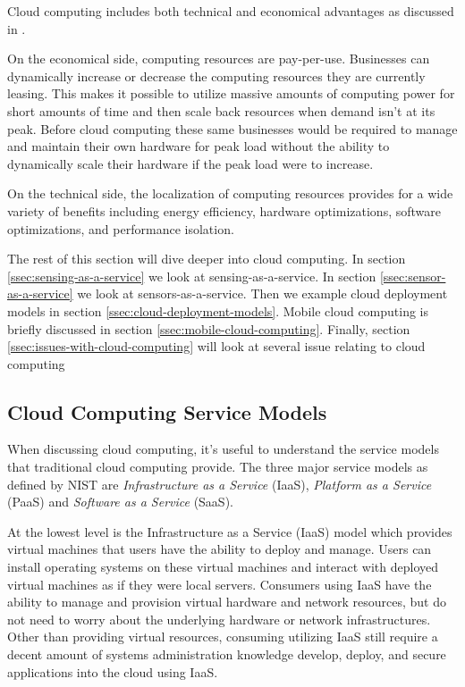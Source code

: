 \documentclass[]{article}
\begin{document}
Cloud computing includes both technical and economical advantages as discussed in \cite{botta_integration_2016}. 

On the economical side, computing resources are pay-per-use. Businesses can dynamically increase or decrease the computing resources they are currently leasing. This makes it possible to utilize massive amounts of computing power for short amounts of time and then scale back resources when demand isn't at its peak. Before cloud computing these same businesses would be required to manage and maintain their own hardware for peak load without the ability to dynamically scale their hardware if the peak load were to increase.

On the technical side, the localization of computing resources provides for a wide variety of benefits including energy efficiency, hardware optimizations, software optimizations, and performance isolation. 

The rest of this section will dive deeper into cloud computing. In section \ref{ssec:sensing-as-a-service} we look at sensing-as-a-service. In section \ref{ssec:sensor-as-a-service} we look at sensors-as-a-service. Then we example cloud deployment models in section \ref{ssec:cloud-deployment-models}. Mobile cloud computing is briefly discussed in section \ref{ssec:mobile-cloud-computing}. Finally, section \ref{ssec:issues-with-cloud-computing} will look at several issue relating to cloud computing

\subsection{Cloud Computing Service Models} \label{ssec:cloud-computing-service-models}
When discussing cloud computing, it's useful to understand the service models that traditional cloud computing provide. The three major service models as defined by NIST\cite{mell2011nist} are \textit{Infrastructure as a Service} (IaaS), \textit{Platform as a Service} (PaaS) and \textit{Software as a Service} (SaaS).

At the lowest level is  the Infrastructure as a Service (IaaS) model which provides virtual machines that users have the ability to  deploy and manage. Users can install operating systems on these virtual machines and interact with deployed virtual machines as if they were local servers.  Consumers using IaaS have the ability to manage and provision virtual hardware and network resources, but do not need to worry about the underlying hardware or network infrastructures. Other than providing virtual resources, consuming utilizing IaaS still require a decent amount of systems administration knowledge develop, deploy, and secure applications into the cloud using IaaS.
\end{document}
